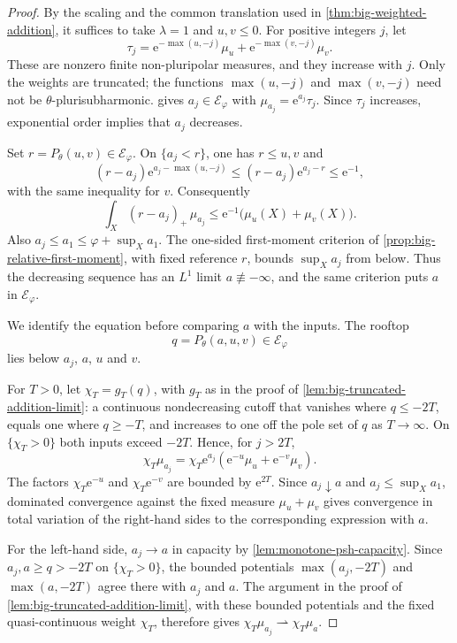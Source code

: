 \begin{proof}
By the scaling and the common translation used in \cref{thm:big-weighted-addition}, it suffices to take $\lambda=1$ and $u,v\leq0$. For positive integers $j$, let
\[
 \tau_j=\mathrm{e}^{-\max(u,-j)}\mu_u+\mathrm{e}^{-\max(v,-j)}\mu_v.
\]
These are nonzero finite non-pluripolar measures, and they increase with $j$. Only the weights are truncated; the functions $\max(u,-j)$ and $\max(v,-j)$ need not be $\theta$-plurisubharmonic.  gives $a_j\in\mathcal E_\varphi$ with $\mu_{a_j}=\mathrm{e}^{a_j}\tau_j$. Since $\tau_j$ increases, exponential order implies that $a_j$ decreases.

Set $r=P_\theta(u,v)\in\mathcal E_\varphi$. On $\{a_j<r\}$, one has $r\leq u,v$ and
\[
 (r-a_j)\mathrm{e}^{a_j-\max(u,-j)}\leq(r-a_j)\mathrm{e}^{a_j-r}\leq \mathrm{e}^{-1},
\]
with the same inequality for $v$. Consequently
\[
 \int_X(r-a_j)_+\,\mu_{a_j}
 \leq \mathrm{e}^{-1}\bigl(\mu_u(X)+\mu_v(X)\bigr).
\]
Also $a_j\leq a_1\leq\varphi+\sup_Xa_1$. The one-sided first-moment criterion of \cref{prop:big-relative-first-moment}, with fixed reference $r$, bounds $\sup_Xa_j$ from below. Thus the decreasing sequence has an $L^1$ limit $a\not\equiv-\infty$, and the same criterion puts $a$ in $\mathcal E_\varphi$.

We identify the equation before comparing $a$ with the inputs. The rooftop
\[
 q=P_\theta(a,u,v)\in\mathcal E_\varphi
\]
lies below $a_j$, $a$, $u$ and $v$.

For $T>0$, let $\chi_T=g_T(q)$, with $g_T$ as in the proof of \cref{lem:big-truncated-addition-limit}: a continuous nondecreasing cutoff that vanishes where $q\leq-2T$, equals one where $q\geq-T$, and increases to one off the pole set of $q$ as $T\to\infty$. On $\{\chi_T>0\}$ both inputs exceed $-2T$. Hence, for $j>2T$,
\begin{equation}\label{eq:unrestricted-addition-cutoff}
 \chi_T\mu_{a_j}
 =\chi_T \mathrm{e}^{a_j}(\mathrm{e}^{-u}\mu_u+\mathrm{e}^{-v}\mu_v).
\end{equation}
The factors $\chi_T\mathrm{e}^{-u}$ and $\chi_T\mathrm{e}^{-v}$ are bounded by $\mathrm{e}^{2T}$. Since $a_j\downarrow a$ and $a_j\leq\sup_Xa_1$, dominated convergence against the fixed measure $\mu_u+\mu_v$ gives convergence in total variation of the right-hand sides to the corresponding expression with $a$.

For the left-hand side, $a_j\to a$ in capacity by \cref{lem:monotone-psh-capacity}. Since $a_j,a\geq q>-2T$ on $\{\chi_T>0\}$, the bounded potentials $\max(a_j,-2T)$ and $\max(a,-2T)$ agree there with $a_j$ and $a$. The argument in the proof of \cref{lem:big-truncated-addition-limit}, with these bounded potentials and the fixed quasi-continuous weight $\chi_T$, therefore gives $\chi_T\mu_{a_j}\rightharpoonup\chi_T\mu_a$.


\end{proof}
